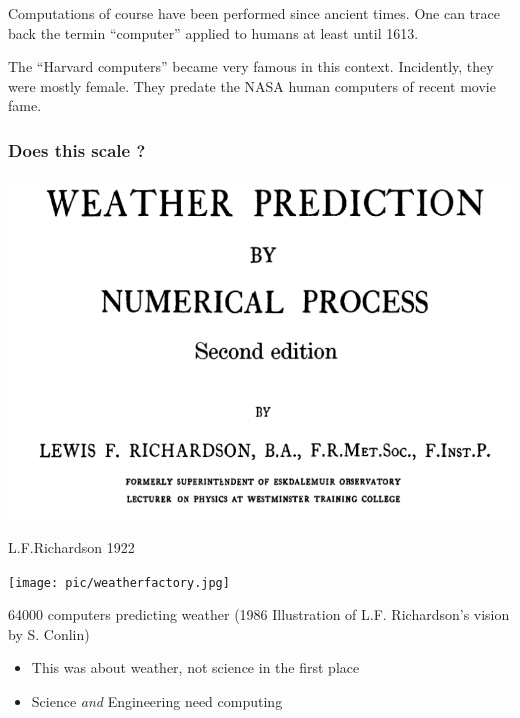 \begin{frame}
  Computations of course have been performed since ancient times. One can 
  trace back the termin ``computer'' applied to humans at least until 1613. 

  The ``Harvard computers'' became very famous in this context. Incidently, they were
  mostly female. They predate the NASA human computers of recent movie fame.

\end{frame}


\begin{frame}\frametitle{Does this scale ?}
  
  \begin{minipage}{0.45\textwidth}
    \includegraphics[width=\textwidth]{pic/richardsbook}
    \vspace{1.25cm}
    
    L.F.Richardson 1922
  \end{minipage}\hfill
  \begin{minipage}{0.45\textwidth}
    \texttt{[image: pic/weatherfactory.jpg]}
    
    64000 computers predicting weather (1986 Illustration of L.F. Richardson's vision
    by S. Conlin)
  \end{minipage}
  
  \begin{itemize}
    \tightlist
  \item
    This was about weather, not science in the first place
  \item
    Science \emph{and} Engineering need computing
  \end{itemize}
  
\end{frame}

